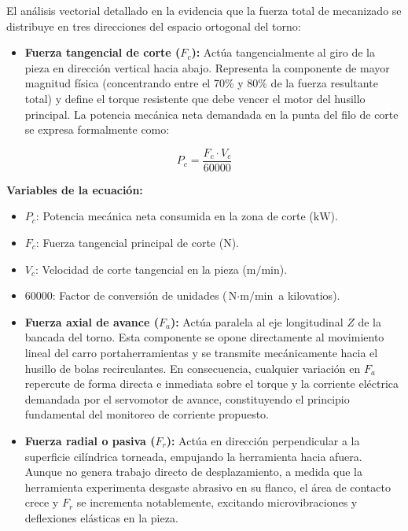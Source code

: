 
El análisis vectorial detallado en la  evidencia que la fuerza total de mecanizado se distribuye en tres direcciones del espacio ortogonal del torno:
\begin{itemize}
    \item \textbf{Fuerza tangencial de corte ($F_c$):} Actúa tangencialmente al giro de la pieza en dirección vertical hacia abajo. Representa la componente de mayor magnitud física (concentrando entre el 70\% y 80\% de la fuerza resultante total) y define el torque resistente que debe vencer el motor del husillo principal. La potencia mecánica neta demandada en la punta del filo de corte se expresa formalmente como:
\end{itemize}

\begin{equation}
P_c = \frac{F_c \cdot V_c}{60000}
\label{eq:potencia_corte}
\end{equation}

\noindent\textbf{Variables de la ecuación:}
\begin{itemize}
    \item $P_c$: Potencia mecánica neta consumida en la zona de corte ($\text{kW}$).
    \item $F_c$: Fuerza tangencial principal de corte ($\text{N}$).
    \item $V_c$: Velocidad de corte tangencial en la pieza ($\text{m/min}$).
    \item $60000$: Factor de conversión de unidades ($\text{N}\cdot\text{m/min}$ a kilovatios).
\end{itemize}

\begin{itemize}
    \item \textbf{Fuerza axial de avance ($F_a$):} Actúa paralela al eje longitudinal $Z$ de la bancada del torno. Esta componente se opone directamente al movimiento lineal del carro portaherramientas y se transmite mecánicamente hacia el husillo de bolas recirculantes. En consecuencia, cualquier variación en $F_a$ repercute de forma directa e inmediata sobre el torque y la corriente eléctrica demandada por el servomotor de avance, constituyendo el principio fundamental del monitoreo de corriente propuesto.
    \item \textbf{Fuerza radial o pasiva ($F_r$):} Actúa en dirección perpendicular a la superficie cilíndrica torneada, empujando la herramienta hacia afuera. Aunque no genera trabajo directo de desplazamiento, a medida que la herramienta experimenta desgaste abrasivo en su flanco, el área de contacto crece y $F_r$ se incrementa notablemente, excitando microvibraciones y deflexiones elásticas en la pieza.
\end{itemize}

